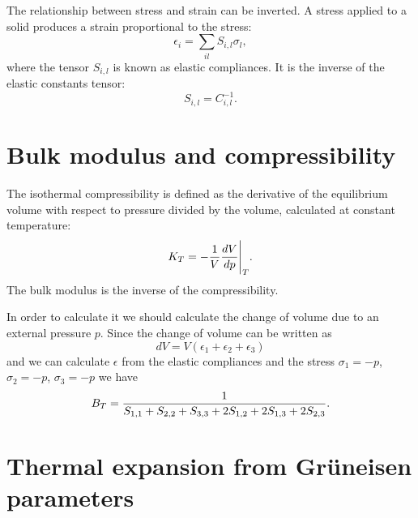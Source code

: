 \documentclass[12pt,a4paper,twoside]{report}
\begin{document}
The relationship between stress and strain can be inverted. A stress 
applied to a solid produces a strain proportional to the stress:
\begin{equation}
\epsilon_{i} =\sum_{il} S_{i,l} \sigma_l, 
\end{equation}
where the tensor $S_{i,l}$ is known as elastic compliances. It is the
inverse of the elastic constants tensor: 
\begin{equation}
S_{i,l} = C_{i,l}^{-1}.
\end{equation}


\newpage
{\color{dark-blue}\chapter{Bulk modulus and compressibility}}
\color{black}

The isothermal compressibility is defined as the derivative of the 
equilibrium volume with respect to pressure divided by the volume,
calculated at constant temperature:
\begin{equation}
K_T = - {1 \over V} {d V \over d p}\Bigg|_T.
\end{equation}
The bulk modulus is the inverse of the compressibility. 

In order to calculate it we should calculate the change of volume
due to an external pressure $p$. Since the change of volume can be
written as 
\begin{equation}
dV = V (\epsilon_1 + \epsilon_2 + \epsilon_3)
\end{equation}
and we can calculate $\epsilon$ from the elastic compliances and the
stress $\sigma_1=-p$, $\sigma_2=-p$, $\sigma_3=-p$ we have
\begin{equation}
B_T = {1 \over S_{1,1}+S_{2,2}+S_{3,3}+2 S_{1,2}+2 S_{1,3}+2 S_{2,3}}.
\end{equation}

\newpage
{\color{dark-blue}\chapter{Thermal expansion from Gr\"uneisen parameters}}
\color{black}
\end{document}
